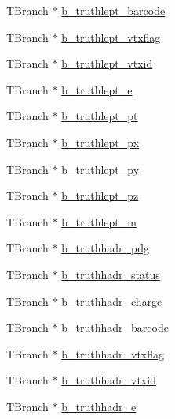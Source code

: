 \begin{DoxyCompactItemize}
\item 
T\+Branch $\ast$ \hyperlink{classJetAnalysisExample_af018843e22a0016d1685bbf5090e8214}{b\+\_\+truthlept\+\_\+barcode}
\item 
T\+Branch $\ast$ \hyperlink{classJetAnalysisExample_a0ede307f4e57f60f5ba1eb995a7b40a0}{b\+\_\+truthlept\+\_\+vtxflag}
\item 
T\+Branch $\ast$ \hyperlink{classJetAnalysisExample_a1ffa9ba24b1e28df0107fd57cd42d24f}{b\+\_\+truthlept\+\_\+vtxid}
\item 
T\+Branch $\ast$ \hyperlink{classJetAnalysisExample_a67d4af5574eb350bd651b34c4897d457}{b\+\_\+truthlept\+\_\+e}
\item 
T\+Branch $\ast$ \hyperlink{classJetAnalysisExample_a3fffd0bc6e2dadb9eee094940c8f66ff}{b\+\_\+truthlept\+\_\+pt}
\item 
T\+Branch $\ast$ \hyperlink{classJetAnalysisExample_ab0111dade6418244c24a592c73855126}{b\+\_\+truthlept\+\_\+px}
\item 
T\+Branch $\ast$ \hyperlink{classJetAnalysisExample_a14d028a45975ce779472050247bf92e5}{b\+\_\+truthlept\+\_\+py}
\item 
T\+Branch $\ast$ \hyperlink{classJetAnalysisExample_ad56bd1a35b82b9a022bb69c3f9bcff01}{b\+\_\+truthlept\+\_\+pz}
\item 
T\+Branch $\ast$ \hyperlink{classJetAnalysisExample_a124e3abcddc0be849f5869d0febbad77}{b\+\_\+truthlept\+\_\+m}
\item 
T\+Branch $\ast$ \hyperlink{classJetAnalysisExample_ab6affffeb4de3f85bb5d20197bd99cf6}{b\+\_\+truthhadr\+\_\+pdg}
\item 
T\+Branch $\ast$ \hyperlink{classJetAnalysisExample_ad9358e510ec6266859c05bd231a509e5}{b\+\_\+truthhadr\+\_\+status}
\item 
T\+Branch $\ast$ \hyperlink{classJetAnalysisExample_a184bc6467f1b1dc2f10e39dc0b4fe0cb}{b\+\_\+truthhadr\+\_\+charge}
\item 
T\+Branch $\ast$ \hyperlink{classJetAnalysisExample_ace506707b95aa6850f7139b924955c28}{b\+\_\+truthhadr\+\_\+barcode}
\item 
T\+Branch $\ast$ \hyperlink{classJetAnalysisExample_ae618e9d9746c4537a290f27e966de01b}{b\+\_\+truthhadr\+\_\+vtxflag}
\item 
T\+Branch $\ast$ \hyperlink{classJetAnalysisExample_aea917d0b4d3d6704dc7a2d979d3252f9}{b\+\_\+truthhadr\+\_\+vtxid}
\item 
T\+Branch $\ast$ \hyperlink{classJetAnalysisExample_ad0569052b828ac71e48b71184e26e437}{b\+\_\+truthhadr\+\_\+e}
\item 

\end{DoxyCompactItemize}
